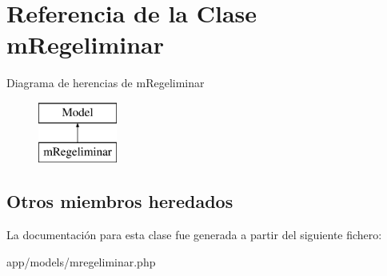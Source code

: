 \hypertarget{classm_regeliminar}{}\section{Referencia de la Clase m\+Regeliminar}
\label{classm_regeliminar}
Diagrama de herencias de m\+Regeliminar\begin{figure}[H]
\begin{center}
\leavevmode
\includegraphics[height=2.000000cm]{classm_regeliminar}
\end{center}
\end{figure}
\subsection*{Otros miembros heredados}


La documentación para esta clase fue generada a partir del siguiente fichero\+:\begin{DoxyCompactItemize}
\item 
app/models/mregeliminar.\+php\end{DoxyCompactItemize}
